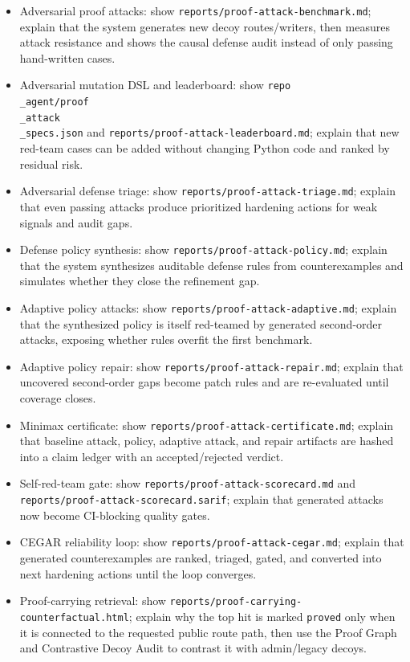 \documentclass[UTF8,12pt,openany]{ctexbook}
\begin{document}
\begin{itemize}
\item Adversarial proof attacks: show \texttt{reports/proof-attack-benchmark.md}; explain that the system generates new decoy routes/writers, then measures attack resistance and shows the causal defense audit instead of only passing hand-written cases.
\item Adversarial mutation DSL and leaderboard: show \texttt{repo\\_agent/proof\\_attack\\_specs.json} and \texttt{reports/proof-attack-leaderboard.md}; explain that new red-team cases can be added without changing Python code and ranked by residual risk.
\item Adversarial defense triage: show \texttt{reports/proof-attack-triage.md}; explain that even passing attacks produce prioritized hardening actions for weak signals and audit gaps.
\item Defense policy synthesis: show \texttt{reports/proof-attack-policy.md}; explain that the system synthesizes auditable defense rules from counterexamples and simulates whether they close the refinement gap.
\item Adaptive policy attacks: show \texttt{reports/proof-attack-adaptive.md}; explain that the synthesized policy is itself red-teamed by generated second-order attacks, exposing whether rules overfit the first benchmark.
\item Adaptive policy repair: show \texttt{reports/proof-attack-repair.md}; explain that uncovered second-order gaps become patch rules and are re-evaluated until coverage closes.
\item Minimax certificate: show \texttt{reports/proof-attack-certificate.md}; explain that baseline attack, policy, adaptive attack, and repair artifacts are hashed into a claim ledger with an accepted/rejected verdict.
\item Self-red-team gate: show \texttt{reports/proof-attack-scorecard.md} and \texttt{reports/proof-attack-scorecard.sarif}; explain that generated attacks now become CI-blocking quality gates.
\item CEGAR reliability loop: show \texttt{reports/proof-attack-cegar.md}; explain that generated counterexamples are ranked, triaged, gated, and converted into next hardening actions until the loop converges.
\item Proof-carrying retrieval: show \texttt{reports/proof-carrying-counterfactual.html}; explain why the top hit is marked \texttt{proved} only when it is connected to the requested public route path, then use the Proof Graph and Contrastive Decoy Audit to contrast it with admin/legacy decoys.

\end{itemize}
\end{document}
